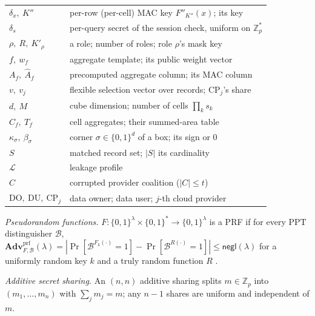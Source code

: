 \documentclass[a4paper,fleqn]{cas-sc}
\newcommand{\negl}{\mathsf{negl}}
\newcommand{\PPT}{\mathrm{PPT}}
\newcommand{\Leak}{\mathcal{L}}
\newcommand{\advPRF}{\mathbf{Adv}^{\mathrm{prf}}}
\begin{document}
\begin{table}[pos=htbp]
\begin{tabular}{@{}l>{\raggedright\arraybackslash}p{5.5cm}@{}}
$\delta_x,\ K''$ & per-row (per-cell) MAC key $F''_{K''}(x)$; its key \\
$\delta_s$ & per-query secret of the session check, uniform on $\mathbb{Z}_p^{*}$ \\
$\rho,\ R,\ K'_\rho$ & a role; number of roles; role $\rho$'s mask key \\
$f,\ w_f$ & aggregate template; its public weight vector \\
$A_f,\ \widehat{A}_f$ & precomputed aggregate column; its MAC column \\
$v,\ v_j$ & flexible selection vector over records; $\text{CP}_j$'s share \\
$d,\ M$ & cube dimension; number of cells $\prod_k s_k$ \\
$C_f,\ T_f$ & cell aggregates; their summed-area table \\
$\kappa_\sigma,\ \beta_\sigma$ & corner $\sigma\in\{0,1\}^d$ of a box; its sign or $0$ \\
$S$ & matched record set; $|S|$ its cardinality \\
$\Leak$ & leakage profile \\
$C$ & corrupted provider coalition ($|C|\le t$) \\
$\mathrm{DO,\ DU},\ \text{CP}_j$ & data owner; data user; $j$-th cloud
provider \\
\bottomrule
\end{tabular}
\end{table}

\emph{Pseudorandom functions.} $F:\{0,1\}^\lambda\times\{0,1\}^*\!\to\!
\{0,1\}^\lambda$ is a PRF if for every $\PPT$ distinguisher $\mathcal{B}$,
$\advPRF_{F,\mathcal{B}}(\lambda)=|\Pr[\mathcal{B}^{F_k(\cdot)}=1]-
\Pr[\mathcal{B}^{R(\cdot)}=1]|\le\negl(\lambda)$ for a uniformly random key
$k$ and a truly random function $R$ \citep{goldreich2019construct}.

\emph{Additive secret sharing.} An $(n,n)$ additive sharing splits
$m\in\mathbb{Z}_p$ into $(m_1,\dots,m_n)$ with $\sum_j m_j=m$; any $n-1$
shares are uniform and independent of $m$.
\end{document}
